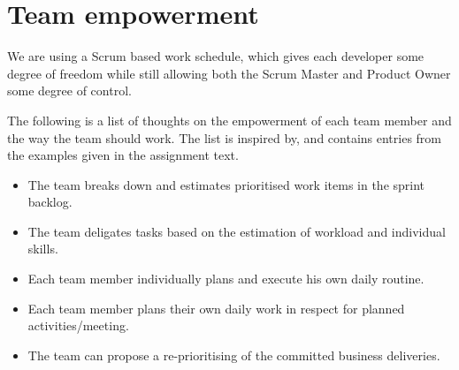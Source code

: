 \section{Team empowerment}

We are using a Scrum based work schedule, which gives each developer some degree of freedom while still allowing both the Scrum Master
and Product Owner some degree of control.

The following is a list of thoughts on the empowerment of each team member and the way the team should work. The list is inspired by, and contains entries from the examples given in the assignment text.
\begin{itemize}
    \item The team breaks down and estimates prioritised work items in the sprint backlog.
    \item The team deligates tasks based on the estimation of workload and individual skills.
    \item Each team member individually plans and execute his own daily routine.
    \item Each team member plans their own daily work in respect for planned activities/meeting.
    \item The team can propose a re-prioritising of the committed business deliveries.
\end{itemize}
